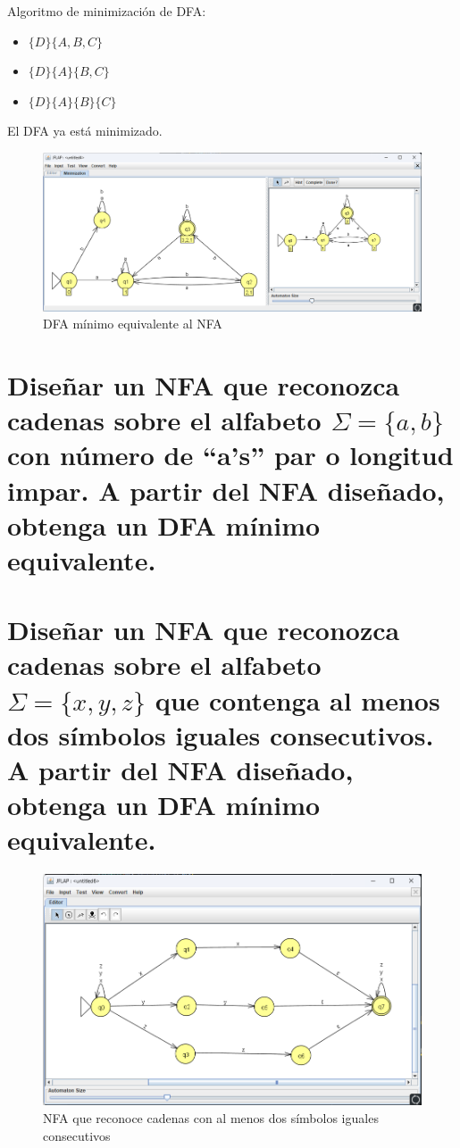 \documentclass[11pt]{report}
\begin{document}
Algoritmo de minimización de DFA:
\begin{itemize}
  \item $\{D\} \{A, B, C\}$
  \item $\{D\} \{A\} \{B, C\}$
  \item $\{D\} \{A\} \{B\} \{C\}$
\end{itemize}

El DFA ya está minimizado.

\begin{figure}[H]
  \centering
  \includegraphics[scale=0.4]{img/DFA_to_DFA_minimized_04.png}
  \caption{DFA mínimo equivalente al NFA}
\end{figure}

\newpage

\section{Diseñar un NFA que reconozca cadenas sobre el alfabeto $\Sigma = \{a, b\}$ con número de “a's” par o longitud impar. A partir del NFA diseñado, obtenga un DFA mínimo equivalente.}

\newpage

\section{Diseñar un NFA que reconozca cadenas sobre el alfabeto $\Sigma = \{x, y, z\}$ que contenga al menos dos símbolos iguales consecutivos. A partir del NFA diseñado, obtenga un DFA mínimo equivalente.}
\begin{figure}[H]
  \centering
  \includegraphics[scale=0.6]{img/NFA_06.png}
  \caption{NFA que reconoce cadenas con al menos dos símbolos iguales consecutivos}
\end{figure}
\end{document}
